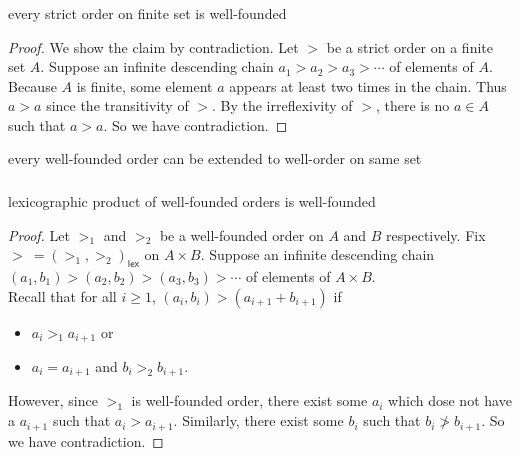 \documentclass[12pt,aspectratio=169]{beamer}
\begin{document}
\begin{frame}
    \frametitle{}
    \begin{lemma}
        every strict order on finite set is well-founded
    \end{lemma}

    \pause

    \begin{proof}
        We show the claim by contradiction.
        \pause
        Let $>$ be a strict order on a finite set $A$.
        \pause
        Suppose an infinite descending chain $a_1 > a_2 > a_3 > \cdots$
        of elements of $A$.
        \pause
        Because $A$ is finite, some element $a$ appears at least two times in the chain.
        Thus $a > a$ since the transitivity of $>$.
        \pause
        By the irreflexivity of $>$, there is no $a \in A$ such that $a > a$.
        \pause
        So we have contradiction.
    \end{proof}

    \pause

    \begin{theorem}
        every well-founded order can be extended to well-order on same set
    \end{theorem}
\end{frame}

\begin{frame}
    \frametitle{}
    \begin{theorem}
        lexicographic product of well-founded orders is well-founded
    \end{theorem}
    \pause
    \begin{proof}
        Let $>_1$ and $>_2$ be a well-founded order on $A$ and $B$ respectively.
        Fix $> \: = (>_1,>_2)_{\mathsf{lex}}$ on $A \times B$.
        \pause
        Suppose an infinite descending chain $(a_1, b_1) > (a_2, b_2) > (a_3, b_3) > \cdots$ of elements of $A \times B$.\\
        \pause
        Recall that for all $i \geq 1$, $(a_i, b_i) > (a_{i+1} + b_{i+1})$ if
        \pause
        \begin{itemize}
            \pause
            \item $a_i >_1 a_{i+1}$ or
            \pause
            \item $a_i = a_{i+1}$ and $b_i >_2 b_{i+1}$.
        \end{itemize}
        \pause
        However, since $>_1$ is well-founded order,
        there exist some $a_i$ which dose not have a $a_{i+1}$ such that $a_i > a_{i+1}$.
        \pause
        Similarly, there exist some $b_i$ such that $b_i \ngtr b_{i+1}$.
        \pause
        So we have contradiction.
    \end{proof}
\end{frame}
\end{document}
